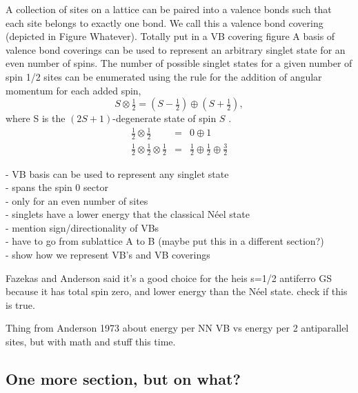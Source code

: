 A collection of sites on a lattice can be paired into a valence bonds such that each site
belongs to exactly one bond.  We call this a valence bond covering (depicted in {\color{red}
Figure Whatever}).  
{\color{red} Totally put in a VB covering figure}
A basis of valence bond coverings can be used to represent an arbitrary singlet state
for an even number of spins.
The number of possible singlet states for a given number of spin 1/2 sites can be enumerated
using the rule for the addition of angular momentum for each added spin,
\begin{equation}
S\otimes \tfrac{1}{2}  = \left(S-\tfrac{1}{2}\right)\oplus\left(S+\tfrac{1}{2}\right),
\end{equation}
where S is the $(2S+1)$-degenerate state of spin $S$ \cite{Beach2006}.
\begin{eqnarray}
\tfrac{1}{2} \otimes \tfrac{1}{2}  &=& 0 \oplus 1\\ \nonumber
\tfrac{1}{2} \otimes \tfrac{1}{2}  \otimes \tfrac{1}{2} &=& 
	\tfrac{1}{2} \oplus  \tfrac{1}{2} \oplus  \tfrac{3}{2}
\end{eqnarray}

- VB basis can be used to represent any singlet state\\
- spans the spin 0 sector\\
- only for an even number of sites\\
- singlets have a lower energy that the classical N\'eel state\\
- mention sign/directionality of VBs\\
- have to go from sublattice A to B (maybe put this in a different section?)\\

- show how we represent VB's and VB coverings

{\color{red} Fazekas and Anderson said it's a good choice for the heis s=1/2 antiferro GS
because it has total spin zero, and lower energy than the N\'eel state.  check if this is true.}

{\color{red} Thing from Anderson 1973 about energy per NN VB vs energy per 2 antiparallel sites,
but with math and stuff this time.}

\subsection{One more section, but on what?}


